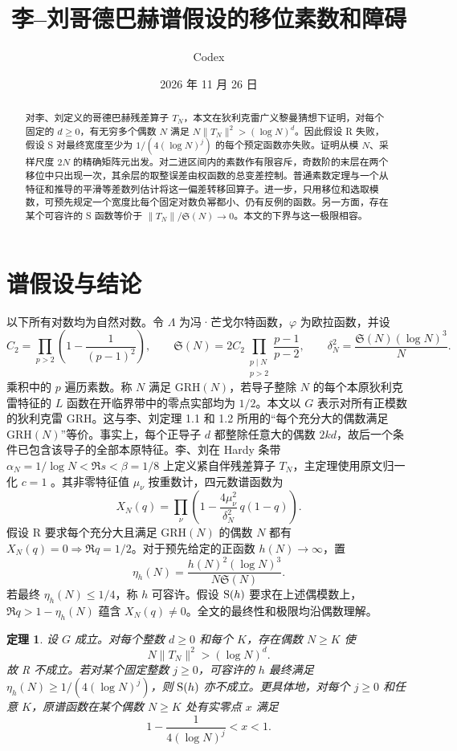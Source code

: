 \documentclass[UTF8,a4paper,11pt,fontset=windows]{ctexart}
\title{\bfseries 李--刘哥德巴赫谱假设的移位素数和障碍}
\author{Codex}
\date{2026 年 11 月 26 日}
\newtheorem{theorem}{定理}
\newcommand{\Sg}{\mathfrak S}
\newcommand{\Lam}{\Lambda}
\newcommand{\GRH}{\mathrm{GRH}}
\begin{document}
\maketitle
\begin{abstract}
对李、刘定义的哥德巴赫残差算子 \(T_N\)，本文在狄利克雷广义黎曼猜想下证明，对每个固定的 \(d\ge0\)，有无穷多个偶数 \(N\) 满足
\(N\|T_N\|^2>(\log N)^d\)。因此假设 R 失败，假设 S 对最终宽度至少为 \(1/(4(\log N)^j)\) 的每个预定函数亦失败。证明从模 \(N\)、采样尺度 \(2N\) 的精确矩阵元出发。对二进区间内的素数作有限容斥，奇数阶的末层在两个移位中只出现一次，其余层的取整误差由权函数的总变差控制。普通素数定理与一个从特征和推导的平滑等差数列估计将这一偏差转移回算子。进一步，只用移位和选取模数，可预先规定一个宽度比每个固定对数负幂都小、仍有反例的函数。另一方面，存在某个可容许的 S 函数等价于 \(\|T_N\|/\Sg(N)\to0\)。本文的下界与这一极限相容。
\end{abstract}

\section{谱假设与结论}
以下所有对数均为自然对数。令 \(\Lam\) 为冯·芒戈尔特函数，\(\varphi\) 为欧拉函数，并设
\[
 C_2=\prod_{p>2}\left(1-\frac1{(p-1)^2}\right),\qquad
 \Sg(N)=2C_2\prod_{\substack{p\mid N\\p>2}}\frac{p-1}{p-2},
 \qquad \delta_N^2=\frac{\Sg(N)(\log N)^3}{N}.
\]
乘积中的 \(p\) 遍历素数。称 \(N\) 满足 \(\GRH(N)\)，若导子整除 \(N\) 的每个本原狄利克雷特征的 \(L\) 函数在开临界带中的零点实部均为 \(1/2\)。本文以 \(G\) 表示对所有正模数的狄利克雷 GRH。这与李、刘定理 1.1 和 1.2 所用的“每个充分大的偶数满足 \(\GRH(N)\)”等价。事实上，每个正导子 \(d\) 都整除任意大的偶数 \(2kd\)，故后一个条件已包含该导子的全部本原特征。李、刘在 Hardy 条带 \(\alpha_N=1/\log N<\Re s<\beta=1/8\) 上定义紧自伴残差算子 \(T_N\)，主定理使用原文归一化 \(c=1\) \cite{LL}。其非零特征值 \(\mu_\nu\) 按重数计，四元数谱函数为
\[
 X_N(q)=\prod_\nu\left(1-\frac{4\mu_\nu^2}{\delta_N^2}\,q(1-q)\right).
\]
假设 R 要求每个充分大且满足 \(\GRH(N)\) 的偶数 \(N\) 都有 \(X_N(q)=0\Rightarrow\Re q=1/2\)。对于预先给定的正函数 \(h(N)\to\infty\)，置
\[
 \eta_h(N)=\frac{h(N)^2(\log N)^3}{N\Sg(N)} .
\]
若最终 \(\eta_h(N)\le1/4\)，称 \(h\) 可容许。假设 \({\rm S}(h)\) 要求在上述偶模数上，\(\Re q>1-\eta_h(N)\) 蕴含 \(X_N(q)\ne0\)。全文的最终性和极限均沿偶数理解。

\begin{theorem}\label{th:main}
设 \(G\) 成立。对每个整数 \(d\ge0\) 和每个 \(K\)，存在偶数 \(N\ge K\) 使
\[
                    N\|T_N\|^2>(\log N)^d.                  \tag{1}
\]
故 R 不成立。若对某个固定整数 \(j\ge0\)，可容许的 \(h\) 最终满足
\(\eta_h(N)\ge 1/(4(\log N)^j)\)，则 \({\rm S}(h)\) 亦不成立。更具体地，对每个 \(j\ge0\) 和任意 \(K\)，原谱函数在某个偶数 \(N\ge K\) 处有实零点 \(x\) 满足
\[
            1-\frac{1}{4(\log N)^j}<x<1.
\]
\end{theorem}
\end{document}
